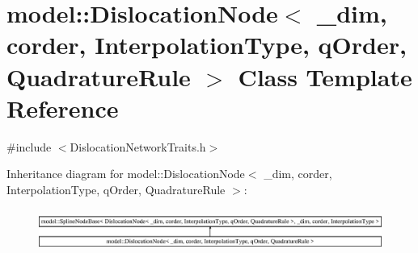 \hypertarget{classmodel_1_1_dislocation_node}{}\section{model\+:\+:Dislocation\+Node$<$ \+\_\+dim, corder, Interpolation\+Type, q\+Order, Quadrature\+Rule $>$ Class Template Reference}
\label{classmodel_1_1_dislocation_node}


{\ttfamily \#include $<$Dislocation\+Network\+Traits.\+h$>$}

Inheritance diagram for model\+:\+:Dislocation\+Node$<$ \+\_\+dim, corder, Interpolation\+Type, q\+Order, Quadrature\+Rule $>$\+:\begin{figure}[H]
\begin{center}
\leavevmode
\includegraphics[height=1.387856cm]{classmodel_1_1_dislocation_node}
\end{center}
\end{figure}
